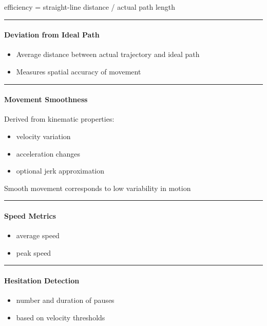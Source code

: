 \documentclass[11pt]{article}
\begin{document}
efficiency = straight-line distance / actual path length


\hrule


\paragraph*{Deviation from Ideal Path}

\begin{itemize}
\item Average distance between actual trajectory and ideal path
\item Measures spatial accuracy of movement
\end{itemize}

\hrule


\paragraph*{Movement Smoothness}

Derived from kinematic properties:


\begin{itemize}
\item velocity variation
\item acceleration changes
\item optional jerk approximation
\end{itemize}

Smooth movement corresponds to low variability in motion


\hrule


\paragraph*{Speed Metrics}

\begin{itemize}
\item average speed
\item peak speed
\end{itemize}

\hrule


\paragraph*{Hesitation Detection}

\begin{itemize}
\item number and duration of pauses
\item based on velocity thresholds
\end{itemize}
\end{document}
